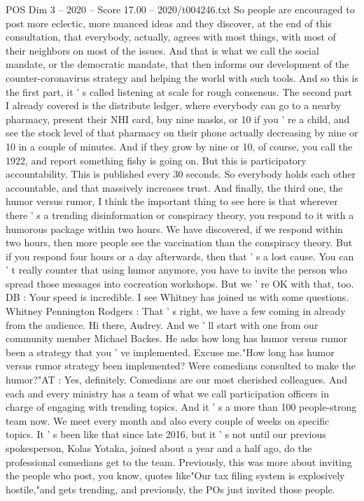 \begin{textsample}{POS Dim 3 – 2020 – Score 17.00 – 2020/t004246.txt}
So people are encouraged to post more eclectic, more nuanced ideas and they discover, at the end of this consultation, that everybody, actually, agrees with most things, with most of their neighbors on most of the issues.
And that is what we call the social mandate, or the democratic mandate, that then informs our development of the counter-coronavirus strategy and helping the world with such tools.
And so this is the first part, it ' s called listening at scale for rough consensus.
The second part I already covered is the distribute ledger, where everybody can go to a nearby pharmacy, present their NHI card, buy nine masks, or 10 if you ' re a child, and see the stock level of that pharmacy on their phone actually decreasing by nine or 10 in a couple of minutes.
And if they grow by nine or 10, of course, you call the 1922, and report something fishy is going on.
But this is participatory accountability.
This is published every 30 seconds.
So everybody holds each other accountable, and that massively increases trust.
And finally, the third one, the humor versus rumor, I think the important thing to see here is that wherever there ' s a trending disinformation or conspiracy theory, you respond to it with a humorous package within two hours.
We have discovered, if we respond within two hours, then more people see the vaccination than the conspiracy theory.
But if you respond four hours or a day afterwards, then that ' s a lost cause.
You can ' t really counter that using humor anymore, you have to invite the person who spread those messages into cocreation workshops.
But we ' re OK with that, too.
DB : Your speed is incredible.
I see Whitney has joined us with some questions.
Whitney Pennington Rodgers : That ' s right, we have a few coming in already from the audience.
Hi there, Audrey.
And we ' ll start with one from our community member Michael Backes.
He asks how long has humor versus rumor been a strategy that you ' ve implemented.
Excuse me."How long has humor versus rumor strategy been implemented?
Were comedians consulted to make the humor?"AT : Yes, definitely.
Comedians are our most cherished colleagues.
And each and every ministry has a team of what we call participation officers in charge of engaging with trending topics.
And it ' s a more than 100 people-strong team now.
We meet every month and also every couple of weeks on specific topics.
It ' s been like that since late 2016, but it ' s not until our previous spokesperson, Kolas Yotaka, joined about a year and a half ago, do the professional comedians get to the team.
Previously, this was more about inviting the people who post, you know, quotes like"Our tax filing system is explosively hostile,"and gets trending, and previously, the POs just invited those people.

\end{textsample}

